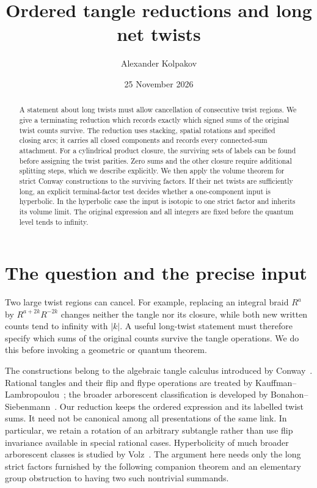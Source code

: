 \documentclass[11pt]{article}
\title{Ordered tangle reductions and long net twists}
\author{Alexander Kolpakov}\date{25 November 2026}
\numberwithin{equation}{section}
\theoremstyle{definition}\newtheorem{definition}[theorem]{Definition}
\theoremstyle{remark}\newtheorem{remark}[theorem]{Remark}
\begin{document}
\maketitle
\begin{abstract}
A statement about long twists must allow cancellation of consecutive
twist regions. We give a terminating reduction which records exactly
which signed sums of the original twist counts survive. The reduction
uses stacking, spatial rotations and specified closing arcs; it carries
all closed components and records every connected-sum attachment. For a
cylindrical product closure, the surviving sets of labels can be found
before assigning the twist parities. Zero sums and the other closure
require additional splitting steps, which we describe explicitly.
We then apply the volume theorem for strict Conway constructions to the
surviving factors. If their net twists are sufficiently long, an explicit
terminal-factor test decides whether a one-component input is hyperbolic.
In the hyperbolic case the input is isotopic to one strict factor and
inherits its volume limit. The original expression and all integers
are fixed before the quantum level tends to infinity.
\end{abstract}

\section{The question and the precise input}\label{cr:introduction}

Two large twist regions can cancel. For example, replacing an integral braid $R^a$ by $R^{a+2k}R^{-2k}$ changes neither the tangle nor its closure, while both new written counts tend to infinity with $|k|$. A useful long-twist statement must therefore specify which sums of the original counts survive the tangle operations. We do this before invoking a geometric or quantum theorem.

The constructions belong to the algebraic tangle calculus introduced by Conway~\cite{Conway}. Rational tangles and their flip and flype operations are treated by Kauffman--Lambropoulou~\cite{KL}; the broader arborescent classification is developed by Bonahon--Siebenmann~\cite{BS}. Our reduction keeps the ordered expression and its labelled twist sums. It need not be canonical among all presentations of the same link. In particular, we retain a rotation of an arbitrary subtangle rather than use flip invariance available in special rational cases. Hyperbolicity of much broader arborescent classes is studied by Volz~\cite{Volz}. The argument here needs only the long strict factors furnished by the following companion theorem and an elementary group obstruction to having two such nontrivial summands.
\end{document}
